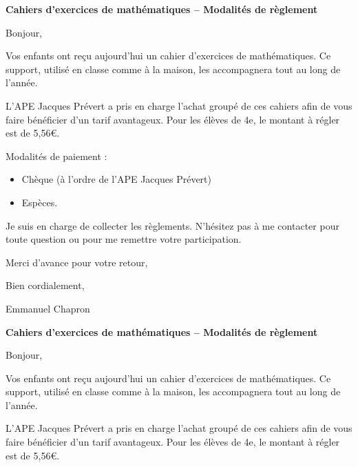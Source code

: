 \documentclass[a4paper]{book}
\begin{document}
\setcounter{chapter}{0}
\newcommand{\montant}{5,56}
\newcommand{\classe}{4e}

    \textbf{Cahiers d’exercices de mathématiques – Modalités de règlement}
    
    Bonjour,

    \medskip
    
    Vos enfants ont reçu aujourd’hui un cahier d’exercices de mathématiques. Ce support, utilisé en classe comme à la maison, les accompagnera tout au long de l’année.

    \medskip

    L’APE Jacques Prévert a pris en charge l’achat groupé de ces cahiers afin de vous faire bénéficier d’un tarif avantageux. Pour les élèves de \classe, le montant à régler est de \montant €.
    
    \medskip

    Modalités de paiement :
    \begin{itemize}
        \item Chèque (à l’ordre de l’APE Jacques Prévert)
        \item Espèces.
    \end{itemize}

    \medskip
    
    Je suis en charge de collecter les règlements. N’hésitez pas à me contacter pour toute question ou pour me remettre votre participation.
    
    Merci d’avance pour votre retour,
    
    Bien cordialement,
    
    Emmanuel Chapron


    \vspace{2cm}
    

    \textbf{Cahiers d’exercices de mathématiques – Modalités de règlement}
    
    Bonjour,

    \medskip
    
    Vos enfants ont reçu aujourd’hui un cahier d’exercices de mathématiques. Ce support, utilisé en classe comme à la maison, les accompagnera tout au long de l’année.

    \medskip

    L’APE Jacques Prévert a pris en charge l’achat groupé de ces cahiers afin de vous faire bénéficier d’un tarif avantageux. Pour les élèves de \classe, le montant à régler est de \montant €.
    
    \medskip
\end{document}
